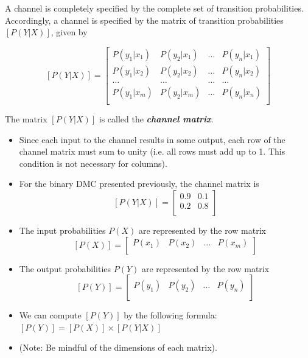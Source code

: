 \documentclass[a4paper,12pt]{article}
\begin{document}
A channel is completely specified by the complete set of transition probabilities. Accordingly, a
channel is specified by the matrix of transition probabilities $[P(Y|X)]$, given by

\[  [P(Y|X)]  = \left[ \begin{array}{cccc}
P(y_1|x_1) & P(y_2|x_1) & \ldots & P(y_n|x_1) \\
P(y_1|x_2) & P(y_2|x_2) & \ldots & P(y_n|x_2) \\
\ldots & \ldots & \ldots & \ldots \\
P(y_1|x_m) & P(y_2|x_m) & \ldots & P(y_n|x_n) \\
\end{array} \right] \]


The matrix $[P(Y|X)]$ is called the \textbf{\emph{channel matrix}}.
 

\begin{itemize}
\item Since each input to the channel results in some
output, each row of the channel matrix must sum to unity (i.e. all rows must add up to 1. This condition is not necessary for columns).
\item For the binary DMC presented previously, the channel matrix is
\[  [P(Y|X)]  = \left[ \begin{array}{cc}
0.9 & 0.1  \\
0.2 & 0.8 \\
\end{array} \right] \]
\end{itemize}


\begin{itemize}
\item The input probabilities $P(X)$ are represented by the row matrix
\[  [P(X)]  = \left[ \begin{array}{cccc}
P(x_1) & P(x_2) & \ldots & P(x_m) \\
\end{array} \right] \]
\item The output probabilities $P(Y)$ are represented by the row matrix
\[  [P(Y)]  = \left[ \begin{array}{cccc}
P(y_1) & P(y_2) & \ldots & P(y_n) \\
\end{array} \right] \]
\item We can compute $[P(Y)] $ by the following formula: $[P(Y)]  = [P(X)]\times [P(Y|X)]$
\item (Note: Be mindful of the dimensions of each matrix).
\end{itemize}
\end{document}
